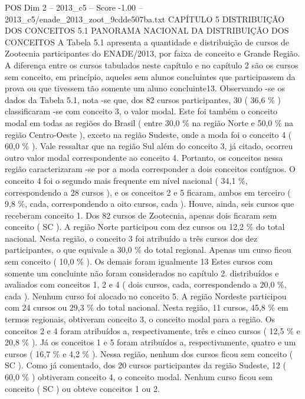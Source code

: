 \begin{textsample}{POS Dim 2 – 2013\_c5 – Score -1.00 – 2013\_c5/enade\_2013\_zoot\_9cdde507ba.txt}  \label{ex:f2_pos_366}
CAPÍTULO 5 DISTRIBUIÇÃO DOS CONCEITOS 5.1 PANORAMA NACIONAL DA DISTRIBUIÇÃO DOS CONCEITOS A Tabela 5.1 apresenta a quantidade e distribuição de cursos de Zootecnia participantes do ENADE/2013, por faixa de conceito e Grande Região.
A diferença entre os cursos tabulados neste capítulo e no capítulo 2 são os cursos sem conceito, em princípio, aqueles sem alunos concluintes que participassem da prova ou que tivessem tão somente um aluno concluinte13.
Observando -se os dados da Tabela 5.1, nota -se que, dos 82 cursos participantes, 30 ( 36,6 \% ) classificaram -se com conceito 3, o valor modal.
Este foi também o conceito modal em todas as regiões do Brasil ( entre 30,0 \% na região Norte e 50,0 \% na região Centro-Oeste ), exceto na região Sudeste, onde a moda foi o conceito 4 ( 60,0 \% ).
Vale ressaltar que na região Sul além do conceito 3, já citado, ocorreu outro valor modal correspondente ao conceito 4.
Portanto, os conceitos nessa região caracterizaram -se por a moda corresponder a dois conceitos contíguos.
O conceito 4 foi o segundo mais frequente em nível nacional ( 34,1 \%, correspondendo a 28 cursos ), e os conceitos 2 e 5 ficaram, ambos em terceiro ( 9,8 \%, cada, correspondendo a oito cursos, cada ).
Houve, ainda, seis cursos que receberam conceito 1.
Dos 82 cursos de Zootecnia, apenas dois ficaram sem conceito ( SC ).
A região Norte participou com dez cursos ou 12,2 \% do total nacional.
Nesta região, o conceito 3 foi atribuído a três cursos dos dez participantes, o que equivale a 30,0 \% do total regional.
Apenas um curso ficou sem conceito ( 10,0 \% ).
Os demais foram igualmente 13 Estes cursos com somente um concluinte não foram considerados no capítulo 2. distribuídos e avaliados com conceitos 1, 2 e 4 ( dois cursos, cada, correspondendo a 20,0 \%, cada ).
Nenhum curso foi alocado no conceito 5.
A região Nordeste participou com 24 cursos ou 29,3 \% do total nacional.
Nesta região, 11 cursos, 45,8 \% em termos regionais, obtiveram conceito 3, o conceito modal para a região.
Os conceitos 2 e 4 foram atribuídos a, respectivamente, três e cinco cursos ( 12,5 \% e 20,8 \% ).
Já os conceitos 1 e 5 foram atribuídos a, respectivamente, quatro e um cursos ( 16,7 \% e 4,2 \% ).
Nessa região, nenhum dos cursos ficou sem conceito ( SC ).
Como já comentado, dos 20 cursos participantes da região Sudeste, 12 ( 60,0 \% ) obtiveram conceito 4, o conceito modal.
Nenhum curso ficou sem conceito ( SC ) ou obteve conceitos 1 ou 2.

\end{textsample}
